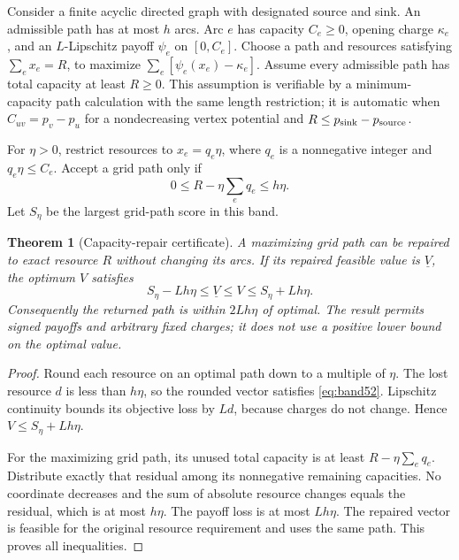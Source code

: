 \documentclass[11pt,letterpaper]{article}
\newtheorem{theorem}{Theorem}[section]
\theoremstyle{definition}\newtheorem{remark}[theorem]{Remark}
\begin{document}
Consider a finite acyclic directed graph with designated source and sink. An admissible path has at most $h$ arcs. Arc $e$ has capacity $C_e\geq0$, opening charge $\kappa_e$, and an $L$-Lipschitz payoff $\psi_e$ on $[0,C_e]$. Choose a path and resources satisfying $\sum_e x_e=R$, to maximize $\sum_e[\psi_e(x_e)-\kappa_e]$. Assume every admissible path has total capacity at least $R\geq0$. This assumption is verifiable by a minimum-capacity path calculation with the same length restriction; it is automatic when $C_{uv}=p_v-p_u$ for a nondecreasing vertex potential and $R\leq p_{\rm sink}-p_{\rm source}$.

For $\eta>0$, restrict resources to $x_e=q_e\eta$, where $q_e$ is a nonnegative integer and $q_e\eta\leq C_e$. Accept a grid path only if
\begin{equation}\label{eq:band52}
 0\leq R-\eta\sum_e q_e\leq h\eta.
\end{equation}
Let $S_\eta$ be the largest grid-path score in this band.
\begin{theorem}[Capacity-repair certificate]\label{thm:repair52}
A maximizing grid path can be repaired to exact resource $R$ without changing its arcs. If its repaired feasible value is $\underline V$, the optimum $V$ satisfies
\begin{equation}\label{eq:generalcert52}
 S_\eta-Lh\eta\leq\underline V\leq V\leq S_\eta+Lh\eta.
\end{equation}
Consequently the returned path is within $2Lh\eta$ of optimal. The result permits signed payoffs and arbitrary fixed charges; it does not use a positive lower bound on the optimal value.
\end{theorem}
\begin{proof}
Round each resource on an optimal path down to a multiple of $\eta$. The lost resource $d$ is less than $h\eta$, so the rounded vector satisfies \eqref{eq:band52}. Lipschitz continuity bounds its objective loss by $Ld$, because charges do not change. Hence $V\leq S_\eta+Lh\eta$.

For the maximizing grid path, its unused total capacity is at least $R-\eta\sum_e q_e$. Distribute exactly that residual among its nonnegative remaining capacities. No coordinate decreases and the sum of absolute resource changes equals the residual, which is at most $h\eta$. The payoff loss is at most $Lh\eta$. The repaired vector is feasible for the original resource requirement and uses the same path. This proves all inequalities.
\end{proof}
\end{document}
